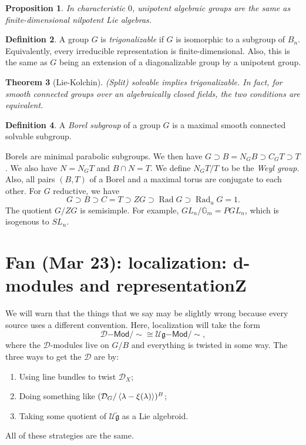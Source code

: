 \documentclass[leqno, openany]{memoir}
\newtheorem{thm}{Theorem}[section]
\newtheorem{prop}[thm]{Proposition}
\theoremstyle{definition}
\newtheorem{defn}[thm]{Definition}
\theoremstyle{remark}
\theoremstyle{plain}
\theoremstyle{definition}
\theoremstyle{remark}
\newcommand{\g}{\mathfrak{g}}
\newcommand{\mc}[1]{\mathcal{#1}}
\newcommand{\on}[1]{\operatorname{#1}}
\newcommand{\ms}[1]{\mathsf{#1}}
\newcommand{\wt}[1]{\widetilde{#1}}
\begin{document}
\begin{prop}
    In characteristic $0$, unipotent algebraic groups are the same as finite-dimensional nilpotent Lie algebras.
\end{prop}

\begin{defn}
    A group $G$ is \textit{trigonalizable} if $G$ is isomorphic to a subgroup of $B_n$. Equivalently, every irreducible representation is finite-dimensional. Also, this is the same as $G$ being an extension of a diagonalizable group by a unipotent group.
\end{defn}

\begin{thm}[Lie-Kolchin]
    (Split) solvable implies trigonalizable. In fact, for smooth connected groups over an algebraically closed fields, the two conditions are equivalent.
\end{thm}

\begin{defn}
    A \textit{Borel subgroup} of a group $G$ is a maximal smooth connected solvable subgroup.
\end{defn}

Borels are minimal parabolic subgroups. We then have $G \supset B = N_G B \supset C_G T \supset T$. We also have $N = N_G T$ and $B \cap N = T$. We define $N_G T / T$ to be the \textit{Weyl group}. Also, all pairs $(B, T)$ of a Borel and a maximal torus are conjugate to each other. For $G$ reductive, we have
\[ G \supset B \supset C = T \supset ZG \supset \on{Rad} G \supset \on{Rad}_u G = 1. \]
The quotient $G / ZG$ is semisimple. For example, $GL_n / \mathbb{G}_m = PGL_n$, which is isogenous to $SL_n$.

\chapter{Fan (Mar 23): localization: d-modules and representationZ}%

We will warn that the things that we say may be slightly wrong because every source uses a different convention. Here, localization will take the form
\[ \mc{D}\ms{-Mod} / \sim \cong \mc{U}\g \ms{-Mod}/\sim, \]
where the $\mc{D}$-modules live on $G/B$ and everything is twisted in some way. The three ways to get the $\mc{D}$ are by:
\begin{enumerate}
    \item Using line bundles to twist $\mc{D}_X$;
    \item Doing something like $(\mc{D}_G / \ev{\lambda - \xi(\lambda)})^B$;
    \item Taking some quotient of $\mc{U} \wt{\g}$ as a Lie algebroid.
\end{enumerate}
All of these strategies are the same.
\end{document}
